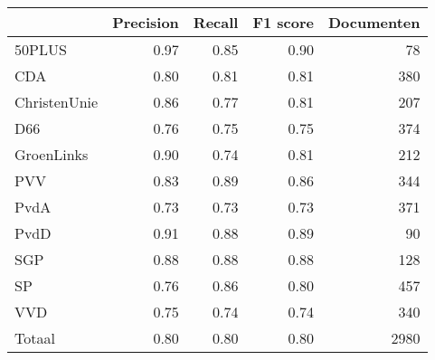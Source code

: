 \begin{tabular}{lrrrr}
\toprule
{} &  Precision &  Recall &  F1 score &  Documenten \\
\midrule
50PLUS       &       0.97 &    0.85 &      0.90 &          78 \\
CDA          &       0.80 &    0.81 &      0.81 &         380 \\
ChristenUnie &       0.86 &    0.77 &      0.81 &         207 \\
D66          &       0.76 &    0.75 &      0.75 &         374 \\
GroenLinks   &       0.90 &    0.74 &      0.81 &         212 \\
PVV          &       0.83 &    0.89 &      0.86 &         344 \\
PvdA         &       0.73 &    0.73 &      0.73 &         371 \\
PvdD         &       0.91 &    0.88 &      0.89 &          90 \\
SGP          &       0.88 &    0.88 &      0.88 &         128 \\
SP           &       0.76 &    0.86 &      0.80 &         457 \\
VVD          &       0.75 &    0.74 &      0.74 &         340 \\
Totaal       &       0.80 &    0.80 &      0.80 &        2980 \\
\bottomrule
\end{tabular}
